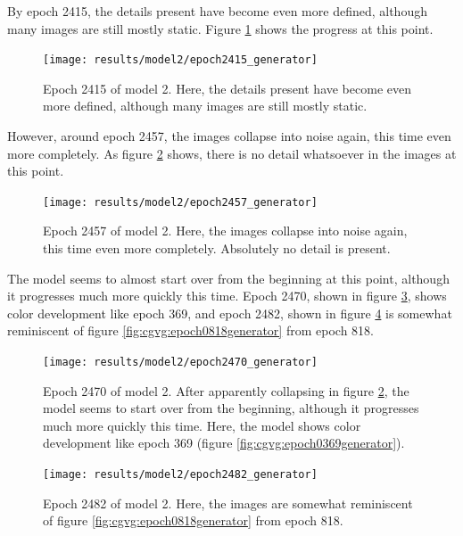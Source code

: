 \documentclass[11pt,letterpaper]{article}
\begin{document}
				By epoch 2415, the details present have become even more defined, although many images are still mostly static.
				Figure \ref{fig:cgvg:epoch2415generator} shows the progress at this point.
				\begin{figure}
					\centering
					\texttt{[image: results/model2/epoch2415\_generator]}
					\caption{Epoch 2415 of model 2. Here, the details present have become even more defined, although many images are still mostly static.}
					\label{fig:cgvg:epoch2415generator}
				\end{figure}

				However, around epoch 2457, the images collapse into noise again, this time even more completely.
				As figure \ref{fig:cgvg:epoch2457generator} shows, there is no detail whatsoever in the images at this point.
				\begin{figure}
					\centering
					\texttt{[image: results/model2/epoch2457\_generator]}
					\caption{Epoch 2457 of model 2. Here, the images collapse into noise again, this time even more completely. Absolutely no detail is present.}
					\label{fig:cgvg:epoch2457generator}
				\end{figure}

				The model seems to almost start over from the beginning at this point, although it progresses much more quickly this time.
				Epoch 2470, shown in figure \ref{fig:cgvg:epoch2470generator}, shows color development like epoch 369, and epoch 2482, shown in figure \ref{fig:cgvg:epoch2482generator} is somewhat reminiscent of figure \ref{fig:cgvg:epoch0818generator} from epoch 818.
				\begin{figure}
					\centering
					\texttt{[image: results/model2/epoch2470\_generator]}
					\caption{Epoch 2470 of model 2. After apparently collapsing in figure \ref{fig:cgvg:epoch2457generator}, the model seems to start over from the beginning, although it progresses much more quickly this time. Here, the model shows color development like epoch 369 (figure \ref{fig:cgvg:epoch0369generator}).}
					\label{fig:cgvg:epoch2470generator}
				\end{figure}

				\begin{figure}
					\centering
					\texttt{[image: results/model2/epoch2482\_generator]}
					\caption{Epoch 2482 of model 2. Here, the images are somewhat reminiscent of figure \ref{fig:cgvg:epoch0818generator} from epoch 818.}
					\label{fig:cgvg:epoch2482generator}
				\end{figure}
\end{document}
